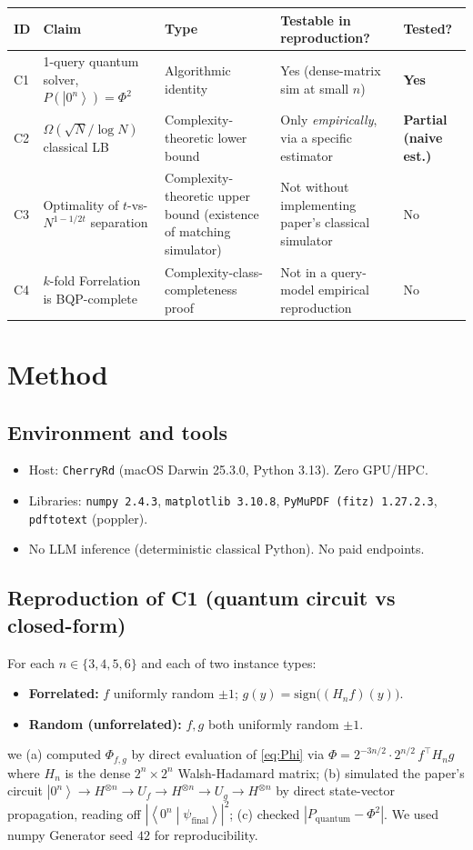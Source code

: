 \documentclass[11pt]{article}
\newcommand{\ket}[1]{\left|#1\right\rangle}
\newcommand{\braket}[2]{\left\langle#1\middle|#2\right\rangle}
\begin{document}
\begin{tabular}{@{}lp{6.4cm}lll@{}}
\toprule
ID & Claim & Type & Testable in reproduction? & Tested? \\
\midrule
C1 & 1-query quantum solver, $P(\ket{0^n}) = \Phi^2$ & Algorithmic identity &
     Yes (dense-matrix sim at small $n$) & \textbf{Yes} \\
C2 & $\Omega(\sqrt{N}/\log N)$ classical LB & Complexity-theoretic lower bound &
     Only \emph{empirically}, via a specific estimator & \textbf{Partial (naive est.)} \\
C3 & Optimality of $t$-vs-$N^{1-1/2t}$ separation & Complexity-theoretic upper
     bound (existence of matching simulator) & Not without implementing paper's
     classical simulator & No \\
C4 & $k$-fold Forrelation is BQP-complete & Complexity-class-completeness proof &
     Not in a query-model empirical reproduction & No \\
\bottomrule
\end{tabular}

\section{Method}
\subsection{Environment and tools}
\begin{itemize}\itemsep0pt
  \item Host: \texttt{CherryRd} (macOS Darwin 25.3.0, Python 3.13). Zero GPU/HPC.
  \item Libraries: \texttt{numpy 2.4.3}, \texttt{matplotlib 3.10.8},
        \texttt{PyMuPDF (fitz) 1.27.2.3}, \texttt{pdftotext} (poppler).
  \item No LLM inference (deterministic classical Python). No paid endpoints.
\end{itemize}

\subsection{Reproduction of C1 (quantum circuit vs closed-form)}
For each $n \in \{3,4,5,6\}$ and each of two instance types:
\begin{itemize}\itemsep0pt
  \item \textbf{Forrelated:} $f$ uniformly random $\pm 1$; $g(y) = \mathrm{sign}\bigl((H_n f)(y)\bigr)$.
  \item \textbf{Random (unforrelated):} $f, g$ both uniformly random $\pm 1$.
\end{itemize}
we (a) computed $\Phi_{f,g}$ by direct evaluation of \eqref{eq:Phi} via
$\Phi = 2^{-3n/2} \cdot 2^{n/2}\, f^{\top} H_n g$ where $H_n$ is the dense
$2^n \times 2^n$ Walsh-Hadamard matrix; (b) simulated the paper's circuit
$\ket{0^n} \to H^{\otimes n} \to U_f \to H^{\otimes n} \to U_g \to H^{\otimes n}$
by direct state-vector propagation, reading off $|\braket{0^n}{\psi_{\mathrm{final}}}|^2$;
(c) checked $|P_{\mathrm{quantum}} - \Phi^2|$.
We used numpy Generator seed $42$ for reproducibility.
\end{document}
